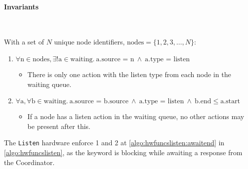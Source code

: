 \clearpage

\paragraph{Invariants} \

With a set of $N$ unique node identifiers, $\text{nodes} = \{ 1, 2, 3, \ldots, N \}$:

\begin{enumerate}
    \item $\forall \text{n} \in \text{nodes}, \exists!\text{a} \in \text{waiting}.\ \text{a.source = n}\ \wedge\ \text{a.type = listen}$
    \begin{itemize}
        \item There is only one action with the listen type from each node in the waiting queue.
    \end{itemize}
    \item $\forall \text{a}, \forall \text{b} \in \text{waiting}.\ \text{a.source = b.source}\ \wedge\ \text{a.type = listen}\ \wedge\ \text{b.end} \leq \text{a.start}$
    \begin{itemize}
        \item If a node has a listen action in the waiting queue, no other actions may be present after this.
    \end{itemize}
\end{enumerate}

The \texttt{Listen} hardware enforce 1 and 2 at \autoref{algo:hwfuncslisten:awaitend} in \autoref{algo:hwfuncslisten}, as the \KwAwait keyword is blocking while awaiting a response from the Coordinator. \medbreak



%
%
%